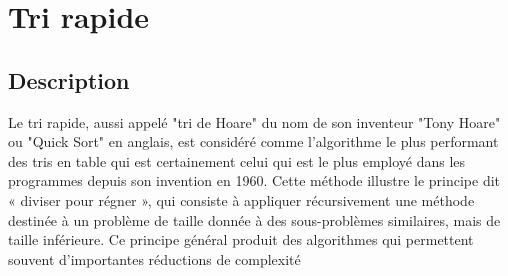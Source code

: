 \chapter{Tri rapide}
\section {Description}
Le tri rapide, aussi appelé "tri de Hoare" du nom de son inventeur "Tony Hoare" ou "Quick Sort" en anglais, est considéré comme l'algorithme le plus performant des tris en table qui est certainement celui qui est le plus employé dans les programmes depuis son invention en 1960. Cette méthode illustre le principe dit « diviser pour régner », qui consiste à appliquer récursivement une méthode destinée à un problème de taille donnée à des sous-problèmes similaires, mais de taille inférieure. Ce principe général produit des algorithmes qui permettent souvent d’importantes réductions de complexité

